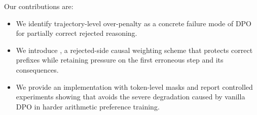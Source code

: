Our contributions are:
\begin{itemize}
    \item We identify trajectory-level over-penalty as a concrete failure mode of DPO for partially correct rejected reasoning.
    \item We introduce \cmdpo, a rejected-side causal weighting scheme that protects correct prefixes while retaining pressure on the first erroneous step and its consequences.
    \item We provide an implementation with token-level masks and report controlled experiments showing that \cmdpo avoids the severe degradation caused by vanilla DPO in harder arithmetic preference training.
\end{itemize}
